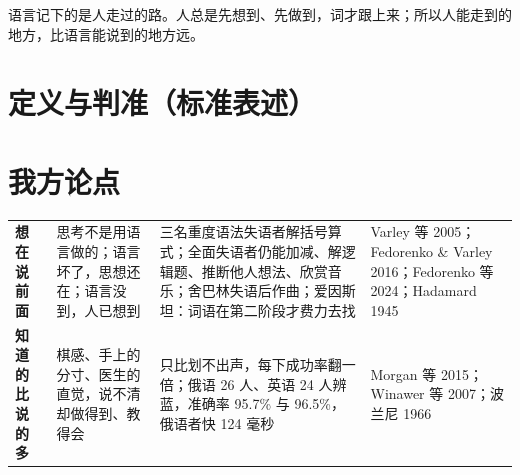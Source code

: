 \documentclass[quick,con]{debate}
\begin{document}
\debatetitle
\begin{thesisbox}语言记下的是人走过的路。人总是先想到、先做到，词才跟上来；所以人能走到的地方，比语言能说到的地方远。\end{thesisbox}

\section{定义与判准（标准表述）}
\begin{fields}
\end{fields}

\section{我方论点}
\begin{tabularx}{\linewidth}{@{}L{5.2em}Y Y L{6.5em}@{}}\toprule
{}&&&\\\midrule
\textbf{想在说前面}&思考不是用语言做的；语言坏了，思想还在；语言没到，人已想到&三名重度语法失语者解括号算式；全面失语者仍能加减、解逻辑题、推断他人想法、欣赏音乐；舍巴林失语后作曲；爱因斯坦：词语在第二阶段才费力去找&Varley 等 2005；Fedorenko \& Varley 2016；Fedorenko 等 2024；Hadamard 1945\\
\textbf{知道的比说的多}&棋感、手上的分寸、医生的直觉，说不清却做得到、教得会&只比划不出声，每下成功率翻一倍；俄语 26 人、英语 24 人辨蓝，准确率 95.7\% 与 96.5\%，俄语者快 124 毫秒&Morgan 等 2015；Winawer 等 2007；波兰尼 1966\\
\bottomrule\end{tabularx}
\end{document}

